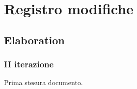 \documentclass[10pt]{softeng} %
\begin{document}
\startofdocument{}









\section{Registro modifiche}

\subsection{Elaboration}

\subsubsection{II iterazione}

Prima stesura documento.


\printcustombib{}

\end{document}

